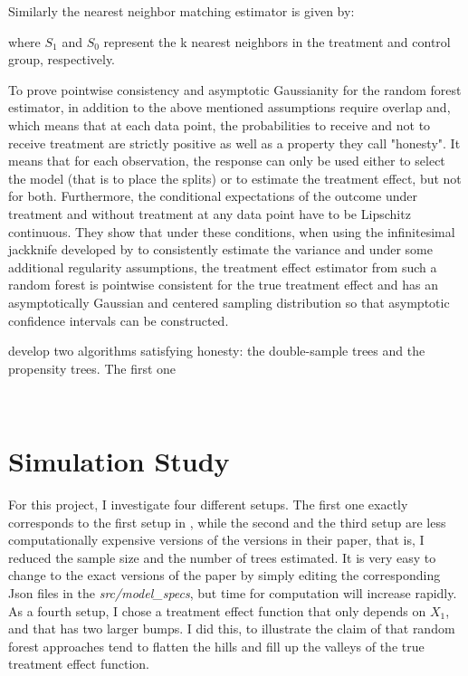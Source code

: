 \documentclass[11pt, a4paper, leqno]{article}
\begin{document}
Similarly the nearest neighbor matching estimator is given by: 

where \(S_1\) and \(S_0\) represent the k nearest neighbors in the treatment and control group, respectively.   

To prove pointwise consistency and asymptotic Gaussianity for the random forest estimator, in addition to the above mentioned assumptions \cite{wa18} require overlap and, which means that at each data point, the probabilities to receive and not to receive treatment are strictly positive as well as a property they call "honesty". It means that for each observation, the response can only be used either to select the model (that is to place the splits) or to estimate the treatment effect, but not for both. Furthermore, the conditional expectations of the outcome under treatment and without treatment at any data point have to be Lipschitz continuous.
They show that under these conditions, when using the infinitesimal jackknife developed by \cite{e14} to consistently estimate the variance and under some additional regularity assumptions, the treatment effect estimator from such a random forest is pointwise consistent for the true treatment effect and has an asymptotically Gaussian and centered sampling distribution so that asymptotic confidence intervals can be constructed. 

\cite{wa18} develop two algorithms satisfying honesty: the double-sample trees and the propensity trees. The first one 



\(\) \(\) 


\section{Simulation Study} %
\label{sec:simulation}

For this project, I investigate four different setups. The first one exactly corresponds to the first setup in \cite{wa18}, while the second and the third setup are less computationally expensive versions of the versions in their paper, that is, I reduced the sample size and the number of trees estimated. It is very easy to change to the exact versions of the paper by simply editing the corresponding Json files in the \textit{src/model\_specs}, but time for computation will increase rapidly. As a fourth setup, I chose a treatment effect function that only depends on \(X_1\), and that has two larger bumps. I did this, to illustrate the claim of \cite[p.~1238]{wa18} that random forest approaches tend to flatten the hills and fill up the valleys of the true treatment effect function.
\end{document}
